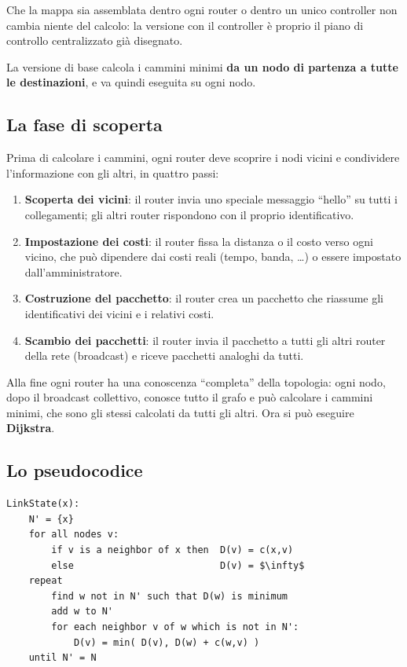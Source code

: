Che la mappa sia assemblata dentro ogni router o dentro un unico controller non cambia niente del calcolo: la versione con il
controller è proprio il piano di controllo centralizzato già disegnato.

La versione di base calcola i cammini minimi \textbf{da un nodo di partenza a tutte le destinazioni}, e va quindi eseguita su
ogni nodo.

\subsection{La fase di scoperta}

Prima di calcolare i cammini, ogni router deve scoprire i nodi vicini e condividere l'informazione con gli altri, in quattro passi:

\begin{enumerate}
    \item \textbf{Scoperta dei vicini}: il router invia uno speciale messaggio ``hello'' su tutti i collegamenti; gli altri router
          rispondono con il proprio identificativo.
    \item \textbf{Impostazione dei costi}: il router fissa la distanza o il costo verso ogni vicino, che può dipendere dai costi reali
          (tempo, banda, \dots) o essere impostato dall'amministratore.
    \item \textbf{Costruzione del pacchetto}: il router crea un pacchetto che riassume gli identificativi dei vicini e i relativi costi.
    \item \textbf{Scambio dei pacchetti}: il router invia il pacchetto a tutti gli altri router della rete (broadcast) e riceve pacchetti
          analoghi da tutti.
\end{enumerate}

Alla fine ogni router ha una conoscenza ``completa'' della topologia: ogni nodo, dopo il broadcast collettivo, conosce tutto il grafo
e può calcolare i cammini minimi, che sono gli stessi calcolati da tutti gli altri. Ora si può eseguire \textbf{Dijkstra}.

\subsection{Lo pseudocodice}

\begin{lstlisting}[mathescape=true, title={Link State (Dijkstra), eseguito dal nodo $x$}]
LinkState(x):
    N' = {x}
    for all nodes v:
        if v is a neighbor of x then  D(v) = c(x,v)
        else                          D(v) = $\infty$
    repeat
        find w not in N' such that D(w) is minimum
        add w to N'
        for each neighbor v of w which is not in N':
            D(v) = min( D(v), D(w) + c(w,v) )
    until N' = N
\end{lstlisting}

